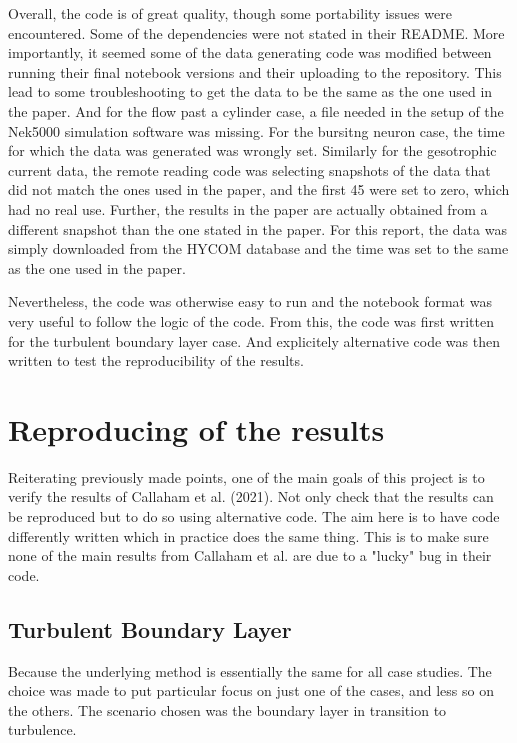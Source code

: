 \documentclass[12pt]{report} %
\begin{document}
Overall, the code is of great quality, though some portability issues were encountered. Some of the dependencies were not stated in their README. More importantly, it seemed some of the data generating code was modified between running their final notebook versions and their uploading to the repository. This lead to some troubleshooting to get the data to be the same as the one used in the paper. And for the flow past a cylinder case, a file needed in the setup of the Nek5000 simulation software was missing\cite{nek5000setup}. For the bursitng neuron case, the time for which the data was generated was wrongly set. Similarly for the gesotrophic current data, the remote reading code was selecting snapshots of the data that did not match the ones used in the paper, and the first 45 were set to zero, which had no real use. Further, the results in the paper are actually obtained from a different snapshot than the one stated in the paper. For this report, the data was simply downloaded from the HYCOM database \cite{hycom} and the time was set to the same as the one used in the paper.

Nevertheless, the code was otherwise easy to run and the notebook format was very useful to follow the logic of the code. From this, the code was first written for the turbulent boundary layer case. And explicitely alternative code was then written to test the reproducibility of the results.

\section{Reproducing of the results}

Reiterating previously made points, one of the main goals of this project is to verify the results of Callaham et al. (2021)\cite{callaham2021learning}. Not only check that the results can be reproduced but to do so using alternative code. The aim here is to have code differently written which in practice does the same thing. This is to make sure none of the main results from Callaham et al. are due to a "lucky" bug in their code.

\subsection{Turbulent Boundary Layer}

Because the underlying method is essentially the same for all case studies. The choice was made to put particular focus on just one of the cases, and less so on the others. The scenario chosen was the boundary layer in transition to turbulence.
\end{document}
